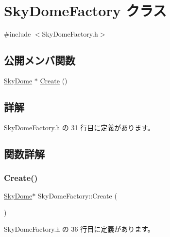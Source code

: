 \hypertarget{class_sky_dome_factory}{}\section{Sky\+Dome\+Factory クラス}
\label{class_sky_dome_factory}


{\ttfamily \#include $<$Sky\+Dome\+Factory.\+h$>$}

\subsection*{公開メンバ関数}
\begin{DoxyCompactItemize}
\item 
\mbox{\hyperlink{class_sky_dome}{Sky\+Dome}} $\ast$ \mbox{\hyperlink{class_sky_dome_factory_a70f27fa64d7cbd5164fc44de566a1683}{Create}} ()
\end{DoxyCompactItemize}


\subsection{詳解}


 Sky\+Dome\+Factory.\+h の 31 行目に定義があります。



\subsection{関数詳解}
\mbox{\label{class_sky_dome_factory_a70f27fa64d7cbd5164fc44de566a1683}} 
\subsubsection{\texorpdfstring{Create()}{Create()}}
{\footnotesize\ttfamily \mbox{\hyperlink{class_sky_dome}{Sky\+Dome}}$\ast$ Sky\+Dome\+Factory\+::\+Create (\begin{DoxyParamCaption}{ }\end{DoxyParamCaption})\hspace{0.3cm}{\ttfamily [inline]}}



 Sky\+Dome\+Factory.\+h の 36 行目に定義があります。

